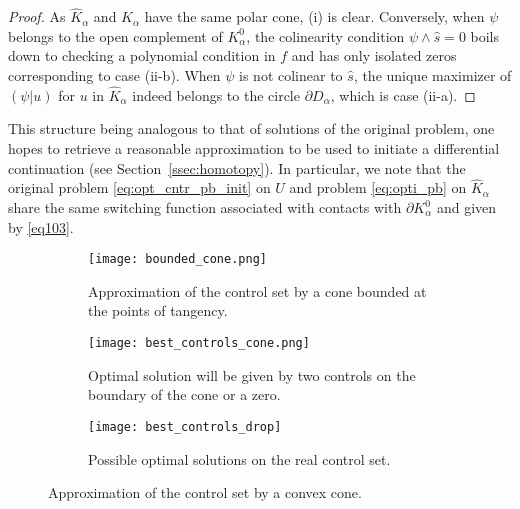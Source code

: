 \documentclass[AMA,STIX1COL]{WileyNJD-v2}
\begin{document}
\begin{proof} As $\hat{K}_\alpha$ and $K_\alpha$ have the same polar cone, (i) is clear. Conversely, when
$\psi$ belongs to the open complement of $K^0_\alpha$, the colinearity condition $\psi \wedge \hat{s}=0$
boils down to checking a polynomial condition in $f$ and has only isolated zeros corresponding to case (ii-b).
When $\psi$ is not colinear to $\hat{s}$,
the unique maximizer of $(\psi|u)$ for $u$ in $\hat{K}_\alpha$ indeed belongs
to the circle $\partial D_\alpha$, which is case (ii-a).
\end{proof}

\noindent This structure being analogous to that of solutions of the original 
problem, one hopes to retrieve a reasonable approximation to be used to initiate a differential continuation
(see Section~\ref{ssec:homotopy}). In particular, we note that the original problem \eqref{eq:opt_cntr_pb_init}
on $U$ and problem \eqref{eq:opti_pb} on $\hat{K}_\alpha$ share the same switching function associated with
contacts with $\partial K^0_\alpha$ and given by \eqref{eq103}.


\begin{figure}[ht]
	\centering
	\begin{subfigure}[t]{0.3\textwidth}
		\centering
		\texttt{[image: bounded\_cone.png]}
		\caption{Approximation of the control set by a cone bounded at the points of tangency.}
		\label{fig:bounded_cone}
	\end{subfigure}
	\hspace{0.5cm}
	\begin{subfigure}[t]{0.3\textwidth}
		\centering
		\texttt{[image: best\_controls\_cone.png]}
		\caption{Optimal solution will be given by two controls on the boundary of the cone or a zero.}
		\label{fig:best_controls_cone}
	\end{subfigure}
	\hspace{0.5cm}
	\begin{subfigure}[t]{0.3\textwidth}
		\texttt{[image: best\_controls\_drop]}
		\caption{Possible optimal solutions on the real control set.}
		\label{fig:best_controls_drop}
	\end{subfigure}
	\caption{Approximation of the control set by a convex cone.}
\end{figure}
\end{document}
